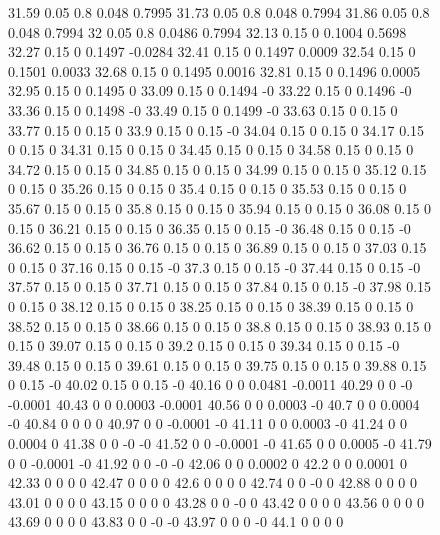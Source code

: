 \documentclass[
    12pt,
    oneside,
    a4paper,
    chapter=TITLE,
    section=TITLE,
    english,
    brazil
]{abntex2}
\begin{document}
\begin{figure}[H]
{        31.59 0.05 0.8 0.048 0.7995
        31.73 0.05 0.8 0.048 0.7994
        31.86 0.05 0.8 0.048 0.7994
        32 0.05 0.8 0.0486 0.7994
        32.13 0.15 0 0.1004 0.5698
        32.27 0.15 0 0.1497 -0.0284
        32.41 0.15 0 0.1497 0.0009
        32.54 0.15 0 0.1501 0.0033
        32.68 0.15 0 0.1495 0.0016
        32.81 0.15 0 0.1496 0.0005
        32.95 0.15 0 0.1495 0
        33.09 0.15 0 0.1494 -0
        33.22 0.15 0 0.1496 -0
        33.36 0.15 0 0.1498 -0
        33.49 0.15 0 0.1499 -0
        33.63 0.15 0 0.15 0
        33.77 0.15 0 0.15 0
        33.9 0.15 0 0.15 -0
        34.04 0.15 0 0.15 0
        34.17 0.15 0 0.15 0
        34.31 0.15 0 0.15 0
        34.45 0.15 0 0.15 0
        34.58 0.15 0 0.15 0
        34.72 0.15 0 0.15 0
        34.85 0.15 0 0.15 0
        34.99 0.15 0 0.15 0
        35.12 0.15 0 0.15 0
        35.26 0.15 0 0.15 0
        35.4 0.15 0 0.15 0
        35.53 0.15 0 0.15 0
        35.67 0.15 0 0.15 0
        35.8 0.15 0 0.15 0
        35.94 0.15 0 0.15 0
        36.08 0.15 0 0.15 0
        36.21 0.15 0 0.15 0
        36.35 0.15 0 0.15 -0
        36.48 0.15 0 0.15 -0
        36.62 0.15 0 0.15 0
        36.76 0.15 0 0.15 0
        36.89 0.15 0 0.15 0
        37.03 0.15 0 0.15 0
        37.16 0.15 0 0.15 -0
        37.3 0.15 0 0.15 -0
        37.44 0.15 0 0.15 -0
        37.57 0.15 0 0.15 0
        37.71 0.15 0 0.15 0
        37.84 0.15 0 0.15 -0
        37.98 0.15 0 0.15 0
        38.12 0.15 0 0.15 0
        38.25 0.15 0 0.15 0
        38.39 0.15 0 0.15 0
        38.52 0.15 0 0.15 0
        38.66 0.15 0 0.15 0
        38.8 0.15 0 0.15 0
        38.93 0.15 0 0.15 0
        39.07 0.15 0 0.15 0
        39.2 0.15 0 0.15 0
        39.34 0.15 0 0.15 -0
        39.48 0.15 0 0.15 0
        39.61 0.15 0 0.15 0
        39.75 0.15 0 0.15 0
        39.88 0.15 0 0.15 -0
        40.02 0.15 0 0.15 -0
        40.16 0 0 0.0481 -0.0011
        40.29 0 0 -0 -0.0001
        40.43 0 0 0.0003 -0.0001
        40.56 0 0 0.0003 -0
        40.7 0 0 0.0004 -0
        40.84 0 0 0 0
        40.97 0 0 -0.0001 -0
        41.11 0 0 0.0003 -0
        41.24 0 0 0.0004 0
        41.38 0 0 -0 -0
        41.52 0 0 -0.0001 -0
        41.65 0 0 0.0005 -0
        41.79 0 0 -0.0001 -0
        41.92 0 0 -0 -0
        42.06 0 0 0.0002 0
        42.2 0 0 0.0001 0
        42.33 0 0 0 0
        42.47 0 0 0 0
        42.6 0 0 0 0
        42.74 0 0 -0 0
        42.88 0 0 0 0
        43.01 0 0 0 0
        43.15 0 0 0 0
        43.28 0 0 -0 0
        43.42 0 0 0 0
        43.56 0 0 0 0
        43.69 0 0 0 0
        43.83 0 0 -0 -0
        43.97 0 0 0 -0
        44.1 0 0 0 0
}
\end{figure}
\end{document}
